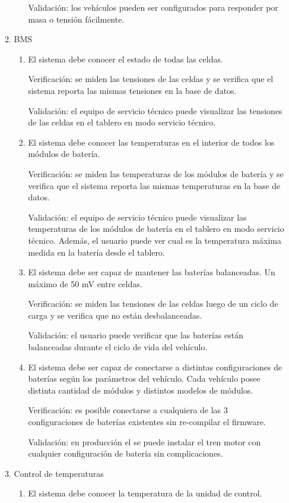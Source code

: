 \documentclass[
11pt, %
codirector, %
]{charter}
\begin{document}
\begin{enumerate}
\begin{enumerate}
\begin{enumerate}
			                  Validación: los vehículos pueden ser configurados para responder por masa o tensión fácilmente.
		            \end{enumerate}
		      \item BMS
		            \begin{enumerate}
			            \item El sistema debe conocer el estado de todas las celdas.

			                  Verificación: se miden las tensiones de las celdas y se verifica que el sistema reporta las mismas tensiones en la base de datos.

			                  Validación: el equipo de servicio técnico puede visualizar las tensiones de las celdas en el tablero en modo servicio técnico.
			            \item El sistema debe conocer las temperaturas en el interior de todos los módulos de batería.

			                  Verificación: se miden las temperaturas de los módulos de batería y se verifica que el sistema reporta las mismas temperaturas en la base de datos.

			                  Validación: el equipo de servicio técnico puede visualizar las temperaturas de los módulos de batería en el tablero en modo servicio técnico. Además, el usuario puede ver cual es la temperatura máxima medida en la batería desde el tablero.
			            \item El sistema debe ser capaz de mantener las baterías balanceadas. Un máximo de 50 mV entre celdas.

			                  Verificación: se miden las tensiones de las celdas luego de un ciclo de carga y se verifica que no están desbalanceadas.

			                  Validación: el usuario puede verificar que las baterías están balanceadas durante el ciclo de vida del vehículo.
			            \item El sistema debe ser capaz de conectarse a distintas configuraciones de baterías según los parámetros del vehículo. Cada vehículo posee distinta cantidad de módulos y distintos modelos de módulos.

			                  Verificación: es posible conectarse a cualquiera de las 3 configuraciones de baterías existentes sin re-compilar el firmware.

			                  Validación: en producción el se puede instalar el tren motor con cualquier configuración de batería sin complicaciones.
		            \end{enumerate}
		      \item Control de temperaturas
		            \begin{enumerate}
			            \item El sistema debe conocer la temperatura de la unidad de control.


\end{enumerate}
\end{enumerate}
\end{enumerate}
\end{document}
